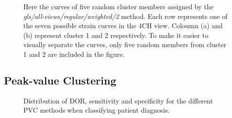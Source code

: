 \clearpage

\begin{figure}[ht]
    \centering
    
    \caption{Here the curves of five random cluster members assigned by the \textit{gls/all-views/regular/weighted/2} method.
             Each row represents one of the seven possible strain curves in the 4CH view. Coloumn (a) and (b) represent cluster 1 and 2 respectively.
             To make it easier to visually separate the curves, only five random members from cluster 1 and 2 are included in the figure.}
    \label{fig:five_members_gls_rls_4CH_regular_complete_two}
\end{figure}

\clearpage

\subsection{Peak-value Clustering}

\begin{figure}[H]
    \centering
    
    \caption{Distribution of DOR, sensitivity and specificity for the different PVC methods when classifying patient diagnosis.}
    \label{fig:pvc_ind_dor_sens_spec_dist}
\end{figure}

